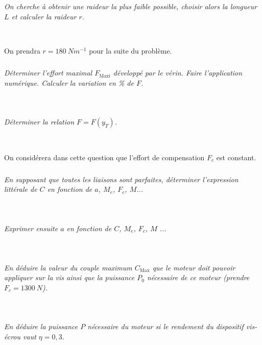 \begin{multicols}{2}
\subparagraph{}\textit{On cherche à obtenir une raideur la plus faible possible, choisir alors la longueur $L$
et calculer la raideur $r$.}
\ifprof
\begin{corrige}~\\
\end{corrige}
\else
\fi

On prendra $r=\SI{180}{Nm^{-1}}$ pour la suite du problème.

\subparagraph{}\textit{Déterminer l’effort maximal $F_{\text{Maxi}}$ développé par le vérin. Faire l’application
numérique. Calculer la variation en \% de $F$.}
\ifprof
\begin{corrige}~\\
\end{corrige}
\else
\fi

\subparagraph{}\textit{Déterminer la relation $F=F(y_T)$.}
\ifprof
\begin{corrige}~\\
\end{corrige}
\else
\fi

On considérera dans cette question que l’effort de compensation $F_c$ est
constant.

\subparagraph{}\textit{En supposant que toutes les liaisons sont parfaites, déterminer l’expression
littérale de $C$ en fonction de $a$, $M_e$, $F_c$, $M$...}
\ifprof
\begin{corrige}~\\
\end{corrige}
\else
\fi

\subparagraph{}\textit{Exprimer ensuite $a$ en fonction de $C$, $M_e$, $F_c$, $M$ ...}
\ifprof
\begin{corrige}~\\
\end{corrige}
\else
\fi

\subparagraph{}\textit{En déduire la valeur du couple maximum $C_{\text{Max}}$ que le moteur doit pouvoir
appliquer sur la vis ainsi que la puissance $P_0$ nécessaire de ce moteur (prendre $F_c = \SI{1300}{N}$).}
\ifprof
\begin{corrige}~\\
\end{corrige}
\else
\fi

\subparagraph{}\textit{En déduire la puissance $P$ nécessaire du moteur si le rendement du dispositif
vis-écrou vaut $\eta=0,3$.}
\ifprof
\begin{corrige}~\\
\end{corrige}
\else
\fi

\end{multicols}

